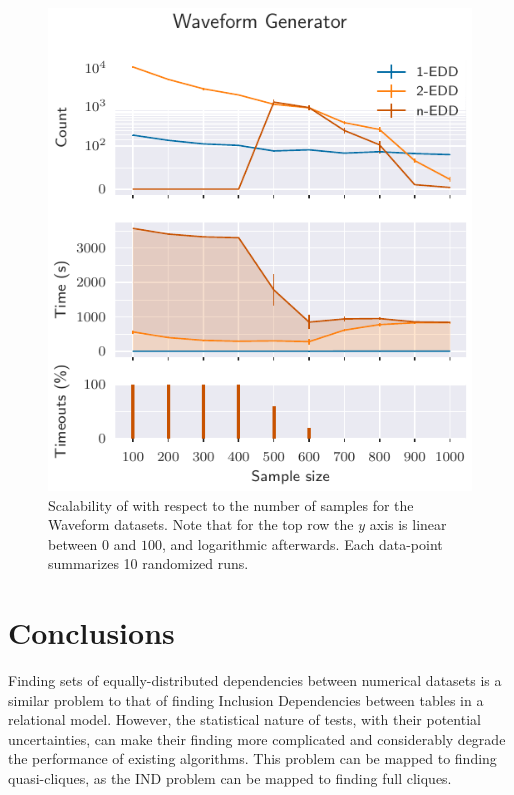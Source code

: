 \begin{figure}[htb]
    \centering
    \includegraphics{images/5_presq/scalability_sample_wave}
    \caption[Scalability of \PresQ with respect to the number of samples.]{
        Scalability of \PresQ with respect to the number of samples for the Waveform datasets.
        Note that for the top row the $y$ axis is linear between $0$ and $100$, and
        logarithmic afterwards. Each data-point summarizes 10 randomized runs.
    }
    \label{fig:scalability_sample_size}
\end{figure}

\FloatBarrier

\section{Conclusions}
\label{sec:presq_conclusions}

Finding sets of equally-distributed dependencies between numerical datasets is a similar
problem to that of finding Inclusion Dependencies between tables in a relational model.
However, the statistical nature of tests, with their potential uncertainties, can make
their finding more complicated and considerably degrade the performance of existing algorithms.
This problem can be mapped to finding quasi-cliques, as the \gls{IND} problem can be
mapped to finding full cliques.


